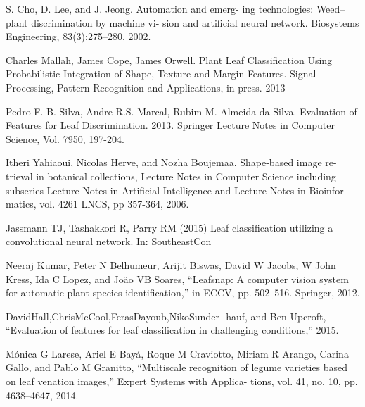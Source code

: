 \documentclass[journal]{IEEEtran}
\begin{document}

%
%
%
\begin{thebibliography}{1}

    S. Cho, D. Lee, and J. Jeong. Automation and emerg- ing technologies: Weed–plant discrimination by machine vi- sion and artificial neural network. Biosystems Engineering, 83(3):275–280, 2002.

    Charles Mallah, James Cope, James Orwell. Plant Leaf Classification Using Probabilistic Integration of Shape, Texture and Margin Features. Signal Processing, Pattern Recognition and Applications, in press. 2013

    Pedro F. B. Silva, Andre R.S. Marcal, Rubim M. Almeida da Silva. Evaluation of Features for Leaf Discrimination. 2013. Springer Lecture Notes in Computer Science, Vol. 7950, 197-204.

    Itheri Yahiaoui, Nicolas Herve, and Nozha Boujemaa. Shape-based image re-trieval in botanical collections, Lecture Notes in Computer Science including subseries Lecture Notes in Artificial Intelligence and Lecture Notes in Bioinfor matics, vol. 4261 LNCS, pp 357-364, 2006.

    Jassmann TJ, Tashakkori R, Parry RM (2015) Leaf classification utilizing a convolutional neural network. In: SoutheastCon

    Neeraj Kumar, Peter N Belhumeur, Arijit Biswas, David W Jacobs, W John Kress, Ida C Lopez, and João VB Soares, “Leafsnap: A computer vision system for automatic plant species identification,” in ECCV, pp. 502–516. Springer, 2012.

    DavidHall,ChrisMcCool,FerasDayoub,NikoSunder- hauf, and Ben Upcroft, “Evaluation of features for leaf classification in challenging conditions,” 2015.

    Mónica G Larese, Ariel E Bayá, Roque M Craviotto, Miriam R Arango, Carina Gallo, and Pablo M Granitto, “Multiscale recognition of legume varieties based on leaf venation images,” Expert Systems with Applica- tions, vol. 41, no. 10, pp. 4638–4647, 2014.


\end{thebibliography}
\end{document}
